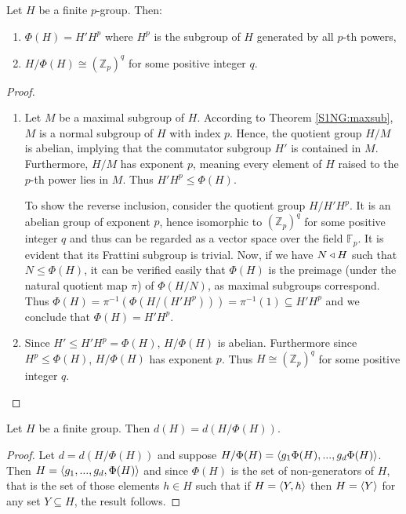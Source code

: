 \begin{theorem}
    \cite[p.~127]{RotmanITG}
    \label{fratpgroup}
    Let $H$ be a finite $p$-group. Then:
    \begin{enumerate}
        \item $\Phi(H) = H'H^p$ where $H^p$ is the subgroup of $H$ generated by all $p$-th powers,
        \item $H/\Phi(H) \cong (\mathbb{Z}_p)^q$ for some positive integer $q$.
    \end{enumerate}
\end{theorem}

\begin{proof}
    \begin{enumerate}
        \item Let $M$ be a maximal subgroup of $H$. According to Theorem \ref{S1NG:maxsub}, $M$ is a normal subgroup of $H$ with index $p$. 
        Hence, the quotient group $H/M$ is abelian, implying that the commutator subgroup $H'$ is contained in $M$. 
        Furthermore, $H/M$ has exponent $p$, meaning every element of $H$ raised to the $p$-th power lies in $M$. 
        Thus $H'H^p \le \Phi(H)$.

        To show the reverse inclusion, consider the quotient group $H/H'H^p$.
        It is an abelian group of exponent $p$, hence isomorphic to $(\mathbb{Z}_p)^q$ for some positive integer $q$ and thus can be regarded as a vector space over the field $\mathbb{F}_p$.
        It is evident that its Frattini subgroup is trivial.
        Now, if we have $N \triangleleft H$ such that $N \le \Phi(H)$, it can be verified easily that $\Phi(H)$ is the preimage (under the natural quotient map $\pi$) of $\Phi(H/N)$, as maximal subgroups correspond.
        Thus $\Phi(H) = \pi^{-1}(\Phi(H/(H'H^p))) = \pi^{-1}(1) \subseteq H'H^p$ and we conclude that $\Phi(H) = H'H^p$.

        \item Since $H' \le H'H^p = \Phi(H)$, $H/\Phi(H)$ is abelian. Furthermore since $H^p \le \Phi(H)$, $H/\Phi(H)$ has exponent $p$.
        Thus $H \cong (\mathbb{Z}_p)^q$ for some positive integer $q$.

    \end{enumerate}
\end{proof}

\begin{theorem}
\label{th:fratgen}
Let $H$ be a finite group. Then $d(H) = d(H/\Phi(H))$.
\end{theorem}
\begin{proof}
    Let $d = d(H/\Phi(H))$ and suppose $H/\Phi(H) = \langle g_1\Phi(H),...,g_d\Phi(H) \rangle$. 
    Then $H = \langle g_1,...,g_d,\Phi(H) \rangle$ and since $\Phi(H)$ is the set of non-generators of $H$, that is the set of those elements $h \in H$ such that if $H = \langle Y, h \rangle$ then $H = \langle Y \rangle$ for any set $Y \subseteq H$, the result follows.
\end{proof}
